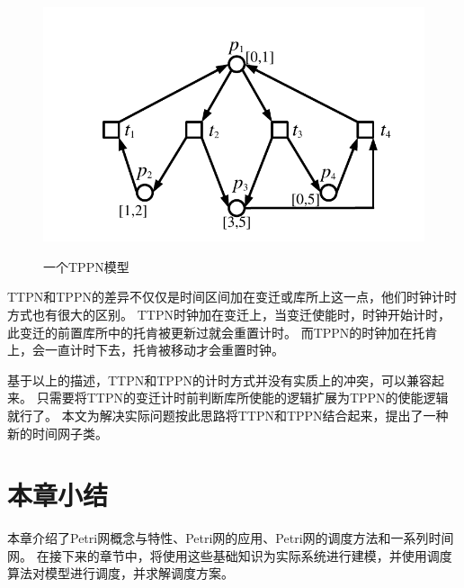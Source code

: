     \begin{figure}[H]
        \centering
        \includegraphics[scale=0.65,angle=0]{figures/figure3-2.pdf}\\
        \caption{一个TPPN模型}
    \end{figure}

    TTPN和TPPN的差异不仅仅是时间区间加在变迁或库所上这一点，他们时钟计时方式也有很大的区别。
    TTPN时钟加在变迁上，当变迁使能时，时钟开始计时，此变迁的前置库所中的托肯被更新过就会重置计时。
    而TPPN的时钟加在托肯上，会一直计时下去，托肯被移动才会重置时钟。

    基于以上的描述，TTPN和TPPN的计时方式并没有实质上的冲突，可以兼容起来。
    只需要将TTPN的变迁计时前判断库所使能的逻辑扩展为TPPN的使能逻辑就行了。
    本文为解决实际问题按此思路将TTPN和TPPN结合起来，提出了一种新的时间网子类。
\section{本章小结}
本章介绍了Petri网概念与特性、Petri网的应用、Petri网的调度方法和一系列时间网。
在接下来的章节中，将使用这些基础知识为实际系统进行建模，并使用调度算法对模型进行调度，并求解调度方案。
